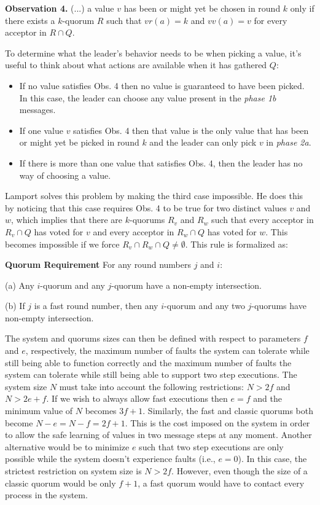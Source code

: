 \begin{displayquote}
	\textbf{Observation 4.} (...) a value $v$ has been or might yet be chosen in round $k$ only if there exists a $k$-quorum $R$ such that $vr(a)=k$ and $vv(a)=v$ for every acceptor in $R \cap Q$.
\end{displayquote}

To determine what the leader's behavior needs to be when picking a value, it's useful to think about what actions are available when it has gathered $Q$:
\begin{itemize}
	\item If no value satisfies Obs. 4 then no value is guaranteed to have been picked. In this case, the leader can choose any value present in the \textit{phase 1b} messages.
	\item If one value $v$ satisfies Obs. 4 then that value is the only value that has been or might yet be picked in round $k$ and the leader can only pick $v$ in \textit{phase 2a}.
	\item If there is more than one value that satisfies Obs. 4, then the leader has no way of choosing a value.
\end{itemize} 

Lamport solves this problem by making the third case impossible. He does this by noticing that this case requires Obs. 4 to be true for two distinct values $v$ and $w$, which implies that there are $k$-quorums $R_v$ and $R_w$ such that every acceptor in $R_v \cap Q$ has voted for $v$ and every acceptor in $R_w \cap Q$ has voted for $w$. This becomes impossible if we force $R_v \cap R_w \cap Q \neq \emptyset$. This rule is formalized as:

\begin{displayquote}
	\textbf{Quorum Requirement} For any round numbers $j$ and $i$:\par
	(a) Any $i$-quorum and any $j$-quorum have a non-empty intersection.\par
	(b) If $j$ is a fast round number, then any $i$-quorum and any two $j$-quorums have non-empty intersection. 	
\end{displayquote}

The system and quorums sizes can then be defined with respect to parameters $f$ and $e$, respectively, the maximum number of faults the system can tolerate while still being able to function correctly and the maximum number of faults the system can tolerate while still being able to support two step executions. The system size $N$ must take into account the following restrictions: $N > 2f$ and $N > 2e+f$. If we wish to always allow fast executions then $e=f$ and the minimum value of $N$ becomes $3f+1$. Similarly, the fast and classic quorums both become $N-e=N-f= 2f+1$. This is the cost imposed on the system in order to allow the safe learning of values in two message steps at any moment. Another alternative would be to minimize $e$ such that two step executions are only possible while the system doesn't experience faults (i.e., $e=0$). In this case, the strictest restriction on system size is $N>2f$. However, even though the size of a classic quorum would be only $f+1$, a fast quorum would have to contact every process in the system.\par
